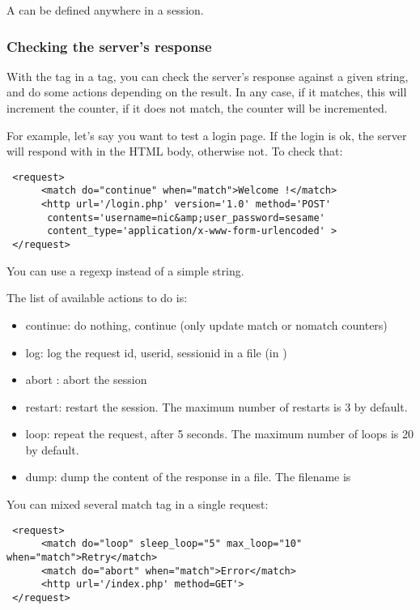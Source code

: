 \documentclass{TSUNG-en}
\begin{document}
A  can be defined anywhere in a session.



\subsubsection{Checking the server's response}


With the tag  in a  tag, you can check
the server's response against a given string, and do some actions
depending on the result. In any case, if it matches, this will
increment the  counter, if it does not match, the
 counter will be incremented.

For example, let's say you want to test a login page. If the login is
ok, the server will respond with  in the
HTML body, otherwise not. To check that:
\begin{Verbatim}
 <request>
      <match do="continue" when="match">Welcome !</match>
      <http url='/login.php' version='1.0' method='POST'
       contents='username=nic&amp;user_password=sesame'
       content_type='application/x-www-form-urlencoded' >
 </request>
\end{Verbatim}

You can use a regexp instead of a simple string.

The list of available actions to do is:
\begin{itemize}
\item continue: do nothing, continue (only update match or nomatch counters)
\item log: log the request id, userid, sessionid in a file (in )
\item abort : abort the session
\item restart: restart the session. The maximum number of
  restarts is 3 by default.
\item loop: repeat the request, after 5 seconds. The maximum number of
  loops is 20 by default.
\item dump: dump the content of the response in a file. The filename
  is 
\end{itemize}

You can mixed several match tag in a single request:
\begin{Verbatim}
 <request>
      <match do="loop" sleep_loop="5" max_loop="10" when="match">Retry</match>
      <match do="abort" when="match">Error</match>
      <http url='/index.php' method=GET'>
 </request>
\end{Verbatim}
\end{document}
